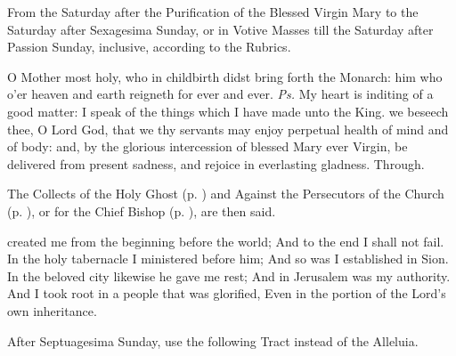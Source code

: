 \begin{rubric}
    {From the Saturday after the Purification of the Blessed Virgin Mary to the Saturday after Sexagesima Sunday, or in Votive Masses till the Saturday after Passion Sunday, inclusive, according to the Rubrics.}
\end{rubric}
\introit
{} O Mother most holy, who in childbirth didst bring forth the Monarch: him who o'er heaven and earth reigneth for ever and ever. \textit{Ps.} My heart is inditing of a good matter: I speak of the things which I have made unto the King.
\collect
{} we beseech thee, O Lord God, that we thy servants may enjoy perpetual health of mind and of body: and, by the glorious intercession of blessed Mary ever Virgin, be delivered from present sadness, and rejoice in everlasting gladness. Through.
\begin{rubric}
    The Collects of the Holy Ghost (p. \pageref{SPHolyGhost}) and Against the Persecutors of the Church (p. \pageref{SPAgainst}), or for the Chief Bishop (p. \pageref{SPChiefBishop}), are then said.
\end{rubric}
 created me from the beginning before the world; And to the end I shall not fail. In the holy tabernacle I ministered before him; And so was I established in Sion. In the beloved city likewise he gave me rest; And in Jerusalem was my authority. And I took root in a people that was glorified, Even in the portion of the Lord’s own inheritance.
\begin{rubric}
    After Septuagesima Sunday, use the following Tract instead of the Alleluia.
\end{rubric}
